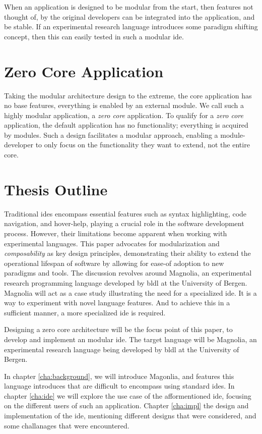 When an application is designed to be modular from the start, then features not
thought of, by the original developers can be integrated into the application,
and be stable. If an experimental research language introduces some paradigm
shifting concept, then this can easily tested in such a modular \gls{ide}.

\section{Zero Core Application}

Taking the modular architecture design to the extreme, the core application has
no base features, everything is enabled by an external module. We call such a
highly modular application, a \textit{zero core} application. To qualify for a
\textit{zero core} application, the default application has no functionality;
everything is acquired by modules. Such a design facilitates a modular approach,
enabling a module-developer to only focus on the functionality they want to
extend, not the entire core.

\section{Thesis Outline}

Traditional \gls{ide}s encompass essential features such as syntax highlighting,
code navigation, and hover-help, playing a crucial role in the software 
development process. However, their limitations become apparent when working with
experimental languages. This paper advocates for modularization and
\textit{composability} as key design principles, demonstrating their ability to
extend the operational lifespan of software by allowing for ease-of adoption to
new paradigms and tools. The discussion revolves around Magnolia, an
experimental research programming language developed by \gls{bldl} at the
University of Bergen. Magnolia will act as a case study illustrating the need for
a specialized \gls{ide}. It is a way to experiment with novel language features.
And to achieve this in a sufficient manner, a more specialized \gls{ide} is
required.

Designing a zero core architecture will be the focus point of this paper, to
develop and implement an modular \gls{ide}. The target language will be Magnolia,
an experimental research language being developed by \gls{bldl} at the University
of Bergen.

In chapter \ref{cha:background}, we will introduce Magonlia, and features this
language introduces that are difficult to encompass using standard \gls{ide}s.
In chapter \ref{cha:ide} we will explore the use case of the afformentioned
\gls{ide}, focusing on the different users of such an application. Chapter
\ref{cha:impl} the design and implementation of the \gls{ide}, mentioning
different designs that were considered, and some challanages that were
encountered.
